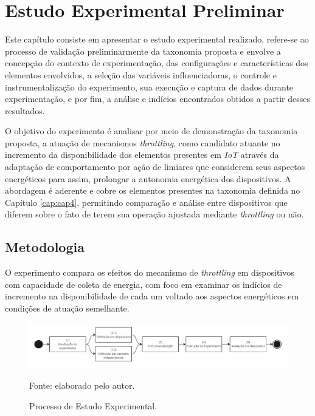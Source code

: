 \chapter{Estudo Experimental Preliminar}
\label{cap:cap6}

Este capítulo consiste em apresentar o estudo experimental realizado, refere-se ao processo de validação preliminarmente da taxonomia proposta e envolve a concepção do contexto de experimentação, das configurações e características dos elementos envolvidos, a seleção das variáveis influenciadoras, o controle e instrumentalização do experimento, sua execução e captura de dados durante experimentação, e por fim, a análise e indícios encontrados obtidos a partir desses resultados. 

O objetivo do experimento é analisar por meio de demonstração da taxonomia proposta, a atuação de mecanismos \textit{throttling}, como candidato atuante no incremento da disponibilidade dos elementos presentes em \textit{IoT} através da adaptação de comportamento por ação de limiares que considerem seus aspectos energéticos para assim,  prolongar a autonomia energética dos dispositivos. A abordagem é aderente e cobre os elementos presentes na taxonomia definida no Capítulo \ref{cap:cap4}, permitindo comparação e análise entre dispositivos que diferem sobre o fato de terem sua operação ajustada mediante \textit{throttling} ou não. 

\section{Metodologia}

O experimento compara os efeitos do mecanismo de \textit{throttling} em dispositivos com capacidade de coleta de energia, com foco em examinar os indícios de incremento na disponibilidade de cada um voltado aos aspectos energéticos em condições de atuação semelhante.

\begin{figure}[H]
	\centering
	\caption{Processo de Estudo Experimental.}
	\label{fig:cap6metodologia}
	\includegraphics[width=1\linewidth]{Imagens/cap6/cap6metodologia.jpg}
	
	Fonte: elaborado pelo autor.
\end{figure} 

